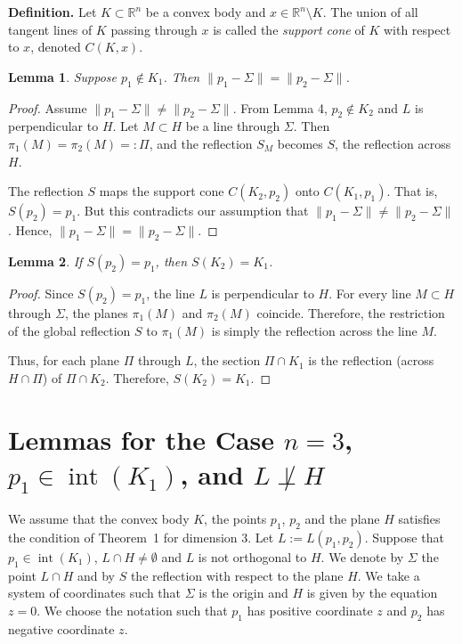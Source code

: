 \documentclass[12pt]{article}
\newtheorem{lemma}{Lemma}
\begin{document}
	\textbf{Definition.} Let $K \subset \mathbb{R}^n$ be a convex body and $x \in \mathbb{R}^n \setminus K$. The union of all tangent lines of $K$ passing through $x$ is called the \emph{support cone} of $K$ with respect to $x$, denoted $C(K, x)$.
	
	\begin{lemma}\label{pastel}
		Suppose $p_1 \notin K_1$. Then $\|p_1 - \Sigma\| = \|p_2 - \Sigma\|$.
	\end{lemma}
	
	\begin{proof}
		Assume $\|p_1 - \Sigma\| \neq \|p_2 - \Sigma\|$. From Lemma 4, $p_2 \notin K_2$ and $L$ is perpendicular to $H$. Let $M \subset H$ be a line through $\Sigma$. Then $\pi_1(M) = \pi_2(M) =: \Pi$, and the reflection $S_M$ becomes $S$, the reflection across $H$.
		
		The reflection $S$ maps the support cone $C(K_2, p_2)$ onto $C(K_1, p_1)$. That is, $S(p_2) = p_1$. But this contradicts our assumption that $\|p_1 - \Sigma\| \neq \|p_2 - \Sigma\|$. Hence, $\|p_1 - \Sigma\| = \|p_2 - \Sigma\|$.
	\end{proof}
	
	\begin{lemma}\label{rica}
		If $S(p_2) = p_1$, then $S(K_2) = K_1$.
	\end{lemma}
	
	\begin{proof}
		Since $S(p_2) = p_1$, the line $L$ is perpendicular to $H$. For every line $M \subset H$ through $\Sigma$, the planes $\pi_1(M)$ and $\pi_2(M)$ coincide. Therefore, the restriction of the global reflection $S$ to $\pi_1(M)$ is simply the reflection across the line $M$.
		
		Thus, for each plane $\Pi$ through $L$, the section $\Pi \cap K_1$ is the reflection (across $H \cap \Pi$) of $\Pi \cap K_2$. Therefore, $S(K_2) = K_1$.
	\end{proof}
	
	\section{Lemmas for the Case $n = 3$, $p_1 \in \operatorname{int}(K_1)$, and $L \not\perp H$}
	
We assume that the convex body $K$, the points $p_1$, $p_2$ and the plane $H$ satisfies the condition of Theorem~1 for dimension 3. Let $L:=L(p_{1},p_{2})$. Suppose  that $p_{1}\in \operatorname{int}( K_{1})$, $L\cap H \not= \emptyset$ and $L$ is not orthogonal to $H$. We denote by $\Sigma$ the point $L\cap H$ and by $S$ the reflection with respect to the plane $H$. We take a system of coordinates such that $\Sigma$ is the origin and $H$ is given by the equation $z=0$. We choose the notation such that $p_{1}$ has positive coordinate $z$ and $p_{2}$ has negative coordinate $z$. 
\end{document}
